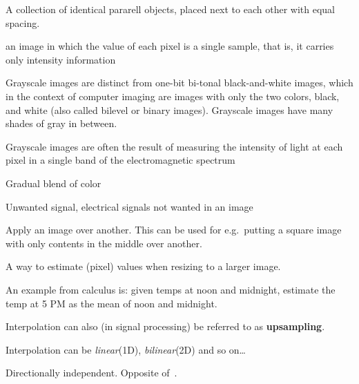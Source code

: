 \begin{definition}[Grating]
    A collection of identical pararell objects, placed next to each other with
    equal spacing.
    \end{definition}
\begin{definition}[Grayscale]
    an image in which the value of each pixel is a single sample, that is, it
    carries only intensity information

    Grayscale images are distinct from one-bit bi-tonal black-and-white images,
    which in the context of computer imaging are images with only the two
    colors, black, and white (also called bilevel or binary images). Grayscale
    images have many shades of gray in between.

    Grayscale images are often the result of measuring the intensity of light
    at each pixel in a single band of the electromagnetic spectrum 

\end{definition}

\begin{definition}
    Gradual blend of color
\end{definition}

\begin{definition}
    Unwanted signal, electrical signals not wanted in an image
\end{definition}

\begin{definition}
    Apply an image over another. This can be used for e.g.\ putting a square image
    with only contents in the middle over another.
\end{definition}

\begin{definition}[Interpolation]
    A way to estimate (pixel) values when resizing to a larger image.

    An example from calculus is: given temps at noon and midnight, estimate
    the temp at 5 PM as the mean of noon and midnight.

    Interpolation can also (in signal processing) be referred to as 
    \textbf{upsampling}.

    Interpolation can be \textit{linear}(1D), \textit{bilinear}(2D) and so on\dots

\end{definition}

\begin{definition}[Isotropy]\label{isotropy}
    Directionally independent. Opposite of~.
\end{definition}

